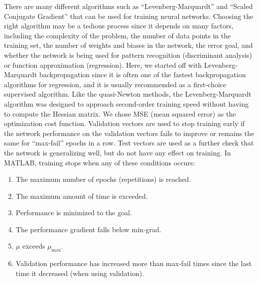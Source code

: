 \documentclass[twocolumn,10pt]{asme2e}
\begin{document}
There are many different algorithms such as ``Levenberg-Marquardt'' and ``Scaled Conjugate Gradient'' that can be used for training neural networks. Choosing the right algorithm may be a tedious process since it depends on many factors, including the complexity of the problem, the number of data points in the training set, the number of weights and biases in the network, the error goal, and whether the network is being used for pattern recognition (discriminant analysis) or function approximation (regression). Here, we started off with Levenberg-Marquardt backpropagation \cite{hagan1994training} since it is often one of the fastest backpropagation algorithms for regression, and it is usually recommended as a first-choice supervised algorithm.
Like the quasi-Newton methods, the Levenberg-Marquardt algorithm was designed to approach second-order training speed without having to compute the Hessian matrix. 
We chose MSE (mean squared error) as the optimization cost function. Validation vectors are used to stop training early if the network performance on the validation vectors fails to improve or remains the same for ``max-fail'' epochs in a row. Test vectors are used as a further check that the network is generalizing well, but do not have any effect on training. In MATLAB, training stops when any of these conditions occurs:
\begin{enumerate}
\item The maximum number of epochs (repetitions) is reached.
\item The maximum amount of time is exceeded.
\item Performance is minimized to the goal.
\item The performance gradient falls below min-grad.
\item $\mu$ exceeds $\mu_{\max}$.
\item Validation performance has increased more than max-fail times since the last time it decreased (when using validation).
\end{enumerate}
\end{document}

